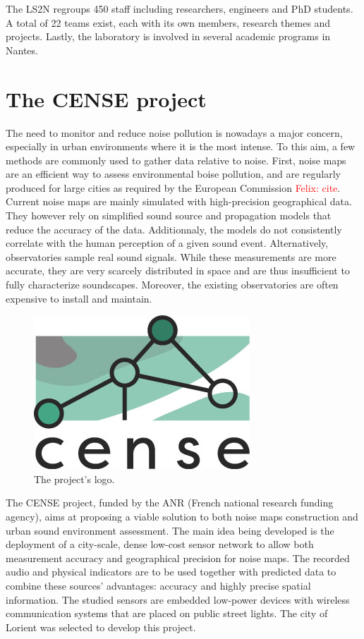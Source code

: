 \documentclass[12pt,times,onecolumn]{article}
\newcommand{\fg}[1]{\textcolor{red}{ Felix: #1}}
\begin{document}
The LS2N regroups 450 staff including researchers, engineers and PhD students. A total of 22 teams exist, each with its own members, research themes and projects. Lastly, the laboratory is involved in several academic programs in Nantes.

\section{The CENSE project}

The need to monitor and reduce noise pollution is nowadays a major concern, especially in urban environments where it is the most intense. To this aim, a few methods are commonly used to gather data relative to noise. First, noise maps are an efficient way to assess environmental boise pollution, and are regularly produced for large cities as required by the European Commission \fg{cite}. Current noise maps are mainly simulated with high-precision geographical data. They however rely on simplified sound source and propagation models that reduce the accuracy of the data. Additionnaly, the models do not consistently correlate with the human perception of a given sound event. Alternatively, observatories sample real sound signals. While these measurements are more accurate, they are very scarcely distributed in space and are thus insufficient to fully characterize soundscapes. Moreover, the existing observatories are often expensive to install and maintain.\\

\begin{figure}[htbp]
	\centering
		\includegraphics[width=0.4\columnwidth]{figures/CENSE-logo.jpg}
	\caption{The project's logo.}
	\label{fig:cense_logo}
\end{figure}

The CENSE project, funded by the ANR (French national research funding agency), aims at proposing a viable solution to both noise maps construction and urban sound environment assessment. The main idea being developed is the deployment of a city-scale, dense low-cost sensor network to allow both measurement accuracy and geographical precision for noise maps. The recorded audio and physical indicators are to be used together with predicted data to combine these sources' advantages: accuracy and highly precise spatial information. The studied sensors are embedded low-power devices with wireless communication systems that are placed on public street lights. The city of Lorient was selected to develop this project.\\
\end{document}
